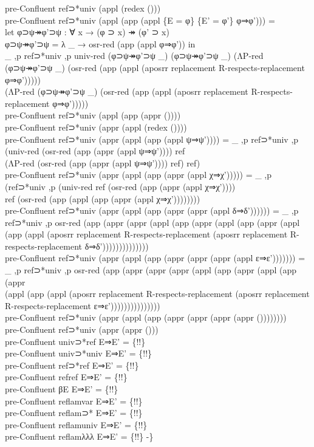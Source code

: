 {\begin{code}
{\>pre-Confluent ref⊃*univ (appl (redex ()))\<\\
\>pre-Confluent ref⊃*univ (appl (app (appl \{E = φ\} \{E' = φ'\} φ⇒φ'))) = \<\\
\>  let φ⊃ψ↠φ'⊃ψ : ∀ x → (φ ⊃ x) ↠ (φ' ⊃ x)\<\\
\>      φ⊃ψ↠φ'⊃ψ = λ \_ → osr-red (app (appl φ⇒φ')) in\<\\
\>  \_ ,p ref⊃*univ ,p univ-red (φ⊃ψ↠φ'⊃ψ \_) (φ⊃ψ↠φ'⊃ψ \_) (ΛP-red (φ⊃ψ↠φ'⊃ψ \_) (osr-red (app (appl (aposrr replacement R-respects-replacement φ⇒φ'))))) \<\\
\>  (ΛP-red (φ⊃ψ↠φ'⊃ψ \_) (osr-red (app (appl (aposrr replacement R-respects-replacement φ⇒φ')))))\<\\
\>pre-Confluent ref⊃*univ (appl (app (appr ())))\<\\
\>pre-Confluent ref⊃*univ (appr (appl (redex ())))\<\\
\>pre-Confluent ref⊃*univ (appr (appl (app (appl ψ⇒ψ')))) = \_ ,p ref⊃*univ ,p (univ-red (osr-red (app (appr (appl ψ⇒ψ')))) ref \<\\
\>  (ΛP-red (osr-red (app (appr (appl ψ⇒ψ')))) ref) ref)\<\\
\>pre-Confluent ref⊃*univ (appr (appl (app (appr (appl χ⇒χ'))))) = \_ ,p (ref⊃*univ ,p (univ-red ref (osr-red (app (appr (appl χ⇒χ')))) \<\\
\>  ref (osr-red (app (appl (app (appr (appl χ⇒χ'))))))))\<\\
\>pre-Confluent ref⊃*univ (appr (appl (app (appr (appr (appl δ⇒δ')))))) = \_ ,p ref⊃*univ ,p osr-red (app (appr (appr (appl (app (appr (appl (app (appr (appl \<\\
\>  (app (appl (aposrr replacement R-respects-replacement (aposrr replacement R-respects-replacement δ⇒δ'))))))))))))))\<\\
\>pre-Confluent ref⊃*univ (appr (appl (app (appr (appr (appr (appl ε⇒ε'))))))) = \_ ,p ref⊃*univ ,p osr-red (app (appr (appr (appr (appl (app (appr (appl (app (appr \<\\
\>  (appl (app (appl (aposrr replacement R-respects-replacement (aposrr replacement R-respects-replacement ε⇒ε')))))))))))))))\<\\
\>pre-Confluent ref⊃*univ (appr (appl (app (appr (appr (appr (appr ())))))))\<\\
\>pre-Confluent ref⊃*univ (appr (appr ()))\<\\
\>pre-Confluent univ⊃*ref E⇒E' = \{!!\}\<\\
\>pre-Confluent univ⊃*univ E⇒E' = \{!!\}\<\\
\>pre-Confluent ref⊃*ref E⇒E' = \{!!\}\<\\
\>pre-Confluent refref E⇒E' = \{!!\}\<\\
\>pre-Confluent βE E⇒E' = \{!!\}\<\\
\>pre-Confluent reflamvar E⇒E' = \{!!\}\<\\
\>pre-Confluent reflam⊃* E⇒E' = \{!!\}\<\\
\>pre-Confluent reflamuniv E⇒E' = \{!!\}\<\\
\>pre-Confluent reflamλλλ E⇒E' = \{!!\} -\}}\<%
\\
\>\<%
\end{code}
}

